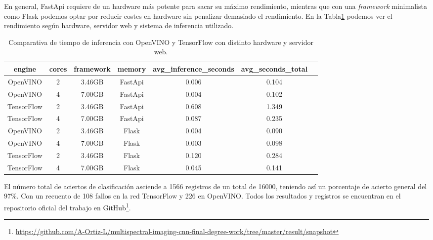En general, FastApi requiere de un hardware más potente para sacar su máximo rendimiento, mientras que con una \textit{framework} minimalista como Flask podemos optar por reducir costes en hardware sin penalizar demasiado el rendimiento.
En la Tabla\ref{tab:Comparativa de tiempo de inferencia con OpenVINO y TensorFlow con distinto hardware y servidor web} podemos ver el rendimiento según hardware, servidor web y sistema de inferencia utilizado.

\begin{table}[ht]
    \footnotesize
    \begin{center}
        \begin{tabular}{ | c | c | c | c| c | c | c |}
            \hline
            engine & cores & framework & memory & avg\_inference\_seconds & avg\_seconds\_total \\ \hline
            OpenVINO & 2 & 3.46GB & FastApi & 0.006 & 0.104 \\
            OpenVINO & 4 & 7.00GB & FastApi & 0.004 & 0.102 \\
            TensorFlow & 2 & 3.46GB & FastApi & 0.608 & 1.349 \\
            TensorFlow & 4 & 7.00GB & FastApi & 0.087 & 0.235 \\
            OpenVINO & 2 & 3.46GB & Flask & 0.004 & 0.090 \\
            OpenVINO & 4 & 7.00GB & Flask & 0.003 & 0.098 \\
            TensorFlow & 2 & 3.46GB & Flask & 0.120 & 0.284 \\
            TensorFlow & 4 & 7.00GB & Flask & 0.045 & 0.141 \\ \hline
        \end{tabular}
    \end{center}
    \caption{Comparativa de tiempo de inferencia con OpenVINO y TensorFlow con distinto hardware y servidor web.}
    \label{tab:Comparativa de tiempo de inferencia con OpenVINO y TensorFlow con distinto hardware y servidor web}
\end{table}


El número total de aciertos de clasificación asciende a 1566 registros de un total de 16000, teniendo así un porcentaje de acierto general
del 97\%. Con un recuento de 108 fallos en la red TensorFlow y 226 en OpenVINO.
Todos los resultados y registros se encuentran en el repositorio oficial del trabajo en GitHub\footnote{\url{https://github.com/A-Ortiz-L/multispectral-imaging-cnn-final-degree-work/tree/master/result/snapshot}}.


